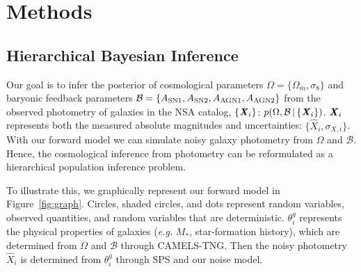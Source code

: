 \section{Methods} \label{sec:methods} 
\subsection{Hierarchical Bayesian Inference} \label{sec:hier} 
Our goal is to infer the posterior of cosmological parameters
$\Omega = \{ \Omega_m, \sigma_8 \}$ and baryonic feedback parameters
$\mathcal{B} = \{ A_{\rm SN1}, A_{\rm SN2}, A_{\rm AGN1}, A_{\rm AGN2}\}$ from
the observed photometry of galaxies in the NSA catalog, $\{\textbf{\textit{X}}_i\}$:
$p(\Omega, \mathcal{B} \,|\, \{{\textbf{\textit{X}}_i}\})$.
${\textbf{\textit{X}}_i}$ represents both the measured absolute magnitudes and
uncertainties: $\{ \hat{X}_i, \sigma_{X,i}\}$. 
With our forward model we can simulate noisy galaxy photometry from $\Omega$
and $\mathcal{B}$. 
Hence, the cosmological inference from photometry can be reformulated as a
hierarchical population inference problem. 

To illustrate this, we graphically represent our forward model in
Figure~\ref{fig:graph}.
Circles, shaded circles, and dots represent random variables, observed
quantities, and random variables that are deterministic. 
$\theta_i^g$ represents the physical properties of galaxies (\emph{e.g.} $M_*$,
star-formation history), which are determined from $\Omega$ and $\mathcal{B}$
through CAMELS-TNG.
Then the noisy photometry $\hat{X}_i$ is determined from $\theta_i^g$ through
SPS and our noise model. 

